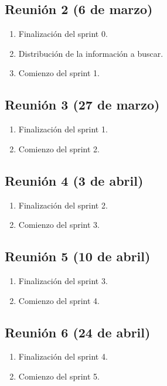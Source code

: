 \documentclass[12pt,letterpaper]{article}
\begin{document}
\subsection{Reunión 2 (6 de marzo)}
\begin{enumerate}
	\item Finalización del sprint 0.
	\item Distribución de la información a buscar.
	\item Comienzo del sprint 1.
\end{enumerate}

\subsection{Reunión 3 (27 de marzo)}
\begin{enumerate}
	\item Finalización del sprint 1.
	\item Comienzo del sprint 2.
\end{enumerate}

\subsection{Reunión 4 (3 de abril)}
\begin{enumerate}
	\item Finalización del sprint 2.
	\item Comienzo del sprint 3.
\end{enumerate}

\subsection{Reunión 5 (10 de abril)}
\begin{enumerate}
	\item Finalización del sprint 3.
	\item Comienzo del sprint 4.
\end{enumerate}

\subsection{Reunión 6 (24 de abril)}
\begin{enumerate}
	\item Finalización del sprint 4.
	\item Comienzo del sprint 5.
\end{enumerate}
\end{document}
